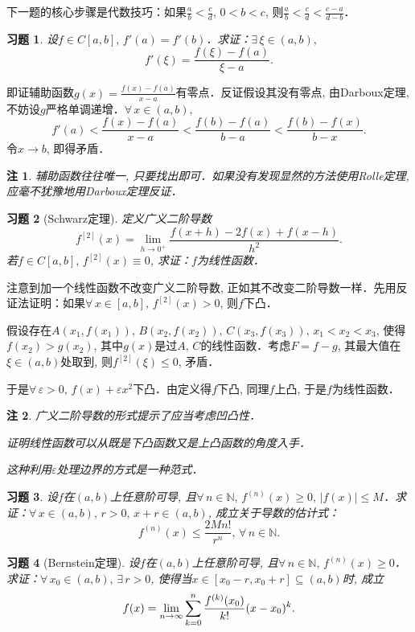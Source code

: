 \documentclass[11pt,a4paper]{ctexart}
\makeatletter
\theoremstyle{thmseries} %
\theoremstyle{exerseries}
\newtheorem{exer}{习题}[section]
\newtheorem*{rem}{注}
\renewenvironment{proof}[1][\proofname]{\par
  \pushQED{\qed}%
  \normalfont \topsep6\p@\@plus6\p@\relax
  \trivlist
  \item[\hskip\labelsep
        \itshape
    #1\@addpunct{}]\ignorespaces
}{%
  \popQED\endtrivlist\@endpefalse
}
\newenvironment{pf}{\begin{proof}[\bfseries\upshape 证\quad]}{\end{proof}}
\renewcommand{\epsilon}{\varepsilon}
\newcommand{\N}{\mathbb{N}}
\def \nti {\mathnormal{n}\to\infty}
\makeatother
\begin{document}
下一题的核心步骤是代数技巧：如果$\frac{a}{b}<\frac{c}{d},\,0<b<c$, 则$\frac{a}{b}<\frac{c}{d}<\frac{c-a}{d-b}$．
\begin{exer}
	设$f\in C[a,b],\,f'(a)=f'(b)$．求证：$\exists\,\xi\in(a,b),$
	\[f'(\xi)=\frac{f(\xi)-f(a)}{\xi-a}.\]
\end{exer}
\begin{pf}
	即证辅助函数$g(x)=\frac{f(x)-f(a)}{x-a}$有零点．反证假设其没有零点, 由Darboux定理, 不妨设$g$严格单调递增．$\forall\,x\in(a,b),$
	\[f'(a)<\frac{f(x)-f(a)}{x-a}<\frac{f(b)-f(a)}{b-a}<\frac{f(b)-f(x)}{b-x}.\]
	令$x\to b$, 即得矛盾．
\end{pf}
\begin{rem}
	辅助函数往往唯一, 只要找出即可．如果没有发现显然的方法使用Rolle定理, 应毫不犹豫地用Darboux定理反证．
\end{rem}

\begin{exer}[Schwarz定理]
	定义广义二阶导数
	\[f^{[2]}(x)=\lim_{h\to0^+}\frac{f(x+h)-2f(x)+f(x-h)}{h^2}.\]
	若$f\in C[a,b],\,f^{[2]}(x)\equiv0$, 求证：$f$为线性函数．
\end{exer}
\begin{pf}
	注意到加一个线性函数不改变广义二阶导数, 正如其不改变二阶导数一样．先用反证法证明：如果$\forall\,x\in[a,b],\,f^{[2]}(x)>0$, 则$f$下凸．

	假设存在$A(x_1,f(x_1)),\,B(x_2,f(x_2)),\,C(x_3,f(x_3)),\,x_1<x_2<x_3$, 使得$f(x_2)>g(x_2)$, 其中$g(x)$是过$A,\,C$的线性函数．考虑$F=f-g$, 其最大值在$\xi\in(a,b)$处取到, 则$f^{[2]}(\xi)\leq0$, 矛盾．

	于是$\forall\,\epsilon>0,\,f(x)+\epsilon x^2$下凸．由定义得$f$下凸, 同理$f$上凸, 于是$f$为线性函数．
\end{pf}
\begin{rem}
	广义二阶导数的形式提示了应当考虑凹凸性．

	证明线性函数可以从既是下凸函数又是上凸函数的角度入手．
	
	这种利用$\epsilon$处理边界的方式是一种范式．
\end{rem}

\begin{exer}
	设$f$在$(a,b)$上任意阶可导, 且$\forall\,n\in\N,\,f^{(n)}(x)\geq0,\,|f(x)|\leq M$．求证：$\forall\,x\in(a,b),\,r>0,\,x+r\in(a,b)$, 成立关于导数的估计式：
	\[f^{(n)}(x)\leq\frac{2Mn!}{r^n},\,\forall\,n\in\N.\]
\end{exer}

\begin{exer}[Bernstein定理]
	设$f$在$(a,b)$上任意阶可导, 且$\forall\,n\in\N,\,f^{(n)}(x)\geq0$．求证：$\forall\,x_0\in(a,b),\,\exists\,r>0$, 使得当$x\in[x_0-r,x_0+r]\subseteq(a,b)$时, 成立
	\[f(x)=\lim_{\nti}\sum_{k=0}^{n}\frac{f^{(k)}(x_0)}{k!}(x-x_0)^k.\]
\end{exer}
\end{document}
